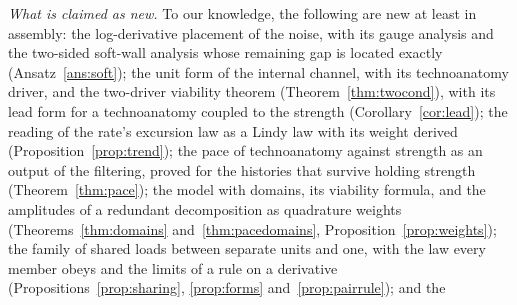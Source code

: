 \emph{What is claimed as new.} To our knowledge, the following are new
at least in assembly: the log-derivative placement of the noise, with
its gauge analysis and the two-sided soft-wall analysis whose
remaining gap is located exactly (Ansatz~\ref{ans:soft}); the unit form
of the internal channel, with its technoanatomy driver, and the two-driver
viability theorem (Theorem~\ref{thm:twocond}), with its lead form for a
technoanatomy coupled to the strength (Corollary~\ref{cor:lead}); the reading of the rate's excursion law as a Lindy law with its weight derived (Proposition~\ref{prop:trend}); the pace of technoanatomy against strength as an output of the filtering, proved for the histories that survive holding strength (Theorem~\ref{thm:pace}); the model with domains, its viability formula, and the amplitudes of a redundant decomposition as quadrature weights (Theorems~\ref{thm:domains} and~\ref{thm:pacedomains}, Proposition~\ref{prop:weights}); the family of shared loads between separate units and one, with the law every member obeys and the limits of a rule on a derivative (Propositions~\ref{prop:sharing}, \ref{prop:forms} and~\ref{prop:pairrule}); and the
